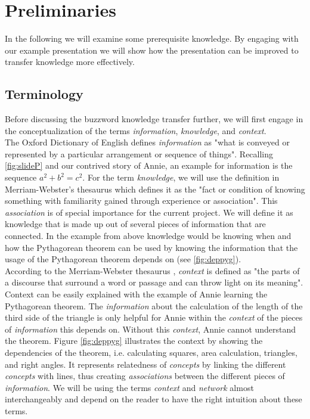 \documentclass[twoside, 12pt]{article}
\begin{document}
\section{Preliminaries}
\label{sec:preliminaries}

In the following we will examine some prerequisite knowledge. By engaging with our example presentation we will show how the presentation can be improved to transfer knowledge more effectively.\\

\subsection{Terminology}
\label{sec:terminology}

Before discussing the buzzword knowledge transfer further, we will first engage in the conceptualization of the terms \textit{information}, \textit{knowledge}, and \textit{context}.\\

The Oxford Dictionary of English \cite{OED:npentrel14} defines \textit{information} as "what is conveyed or represented by a particular arrangement or sequence of things". Recalling \autoref{fig:slideP} and our contrived story of Annie, an example for information is the sequence \textit{$a^2 + b^2 = c^2$}. For the term \textit{knowledge}, we will use the definition in Merriam-Webster's thesaurus \cite{Webster:npentrel14} which defines it as the "fact or condition of knowing something with familiarity gained through experience or association". This \textit{association} is of special importance for the current project. We will define it as knowledge that is made up out of several pieces of information that are connected. In the example from above knowledge would be knowing when and how the Pythagorean theorem can be used by knowing the information that the usage of the Pythagorean theorem depends on (see \autoref{fig:deppyg}).\\ 

According to the Merriam-Webster thesaurus \cite{Webster:npentrel14}, \textit{context} is defined as "the parts of a discourse that surround a word or passage and can throw light on its meaning". Context can be easily explained with the example of Annie learning the Pythagorean theorem. The \textit{information} about the calculation of the length of the third side of the triangle is only helpful for Annie within the \textit{context} of the pieces of \textit{information} this depends on. Without this \textit{context}, Annie cannot understand the theorem. Figure \ref{fig:deppyg} illustrates the context by showing the dependencies of the theorem, i.e. calculating squares, area calculation, triangles, and right angles. It represents relatedness of \textit{concepts} by linking the different \textit{concepts} with lines, thus creating \textit{associations} between the different pieces of \textit{information}. We will be using the terms \textit{context} and \textit{network} almost interchangeably and depend on the reader to have the right intuition about these terms.\\
\end{document}
